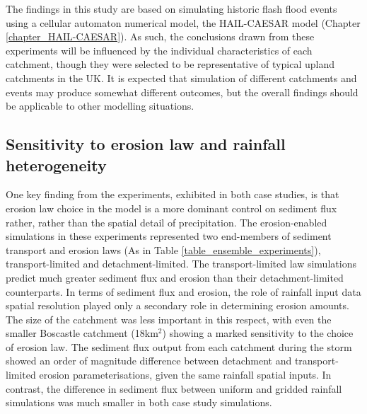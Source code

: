 The findings in this study are based on simulating historic flash flood events using a cellular automaton  numerical model, the HAIL-CAESAR model (Chapter \ref{chapter_HAIL-CAESAR}). As such, the conclusions drawn from these experiments will be influenced by the individual characteristics of each catchment, though they were selected to be representative of typical upland catchments in the UK. It is expected that simulation of different catchments and events may produce somewhat different outcomes, but the overall findings should be applicable to other modelling situations. 

\subsection{Sensitivity to erosion law and rainfall heterogeneity} 
One key finding from the experiments, exhibited in both case studies, is that erosion law choice in the model is a more dominant control on sediment flux rather, rather than the spatial detail of precipitation. The erosion-enabled simulations in these experiments represented two end-members of sediment transport and erosion laws (As in Table \ref{table_ensemble_experiments}), transport-limited and detachment-limited. The transport-limited law simulations predict much greater sediment flux and erosion than their detachment-limited counterparts. In terms of sediment flux and erosion, the role of rainfall input data spatial resolution played only a secondary role in determining erosion amounts. The size of the catchment was less important in this respect, with even the smaller Boscastle catchment (18km\(^2\)) showing a marked sensitivity to the choice of erosion law. The sediment flux output from each catchment during the storm showed an order of magnitude difference between detachment and transport-limited erosion parameterisations, given the same rainfall spatial inputs. In contrast, the difference in sediment flux between uniform and gridded rainfall simulations was much smaller in both case study simulations.

